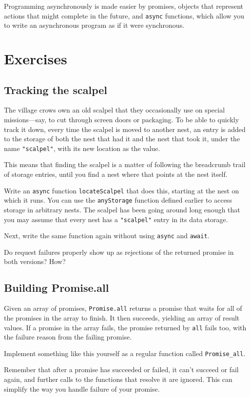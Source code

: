 Programming asynchronously is made easier by promises, objects that represent actions that might complete in the future, and \lstinline`async` functions, which allow you to write an asynchronous program as if it were synchronous.

\section{Exercises}

\subsection{Tracking the scalpel}

The village crows own an old scalpel that they occasionally use on special missions—say, to cut through screen doors or packaging. To be able to quickly track it down, every time the scalpel is moved to another nest, an entry is added to the storage of both the nest that had it and the nest that took it, under the name \lstinline`"scalpel"`, with its new location as the value.

This means that finding the scalpel is a matter of following the breadcrumb trail of storage entries, until you find a nest where that points at the nest itself.

Write an \lstinline`async` function \lstinline`locateScalpel` that does this, starting at the nest on which it runs. You can use the \lstinline`anyStorage` function defined earlier to access storage in arbitrary nests. The scalpel has been going around long enough that you may assume that every nest has a \lstinline`"scalpel"` entry in its data storage.

Next, write the same function again without using \lstinline`async` and \lstinline`await`.

Do request failures properly show up as rejections of the returned promise in both versions? How?

\subsection{Building Promise.all}

Given an array of promises, \lstinline`Promise.all` returns a promise that waits for all of the promises in the array to finish. It then succeeds, yielding an array of result values. If a promise in the array fails, the promise returned by \lstinline`all` fails too, with the failure reason from the failing promise.

Implement something like this yourself as a regular function called \lstinline`Promise_all`.

Remember that after a promise has succeeded or failed, it can't succeed or fail again, and further calls to the functions that resolve it are ignored. This can simplify the way you handle failure of your promise.
